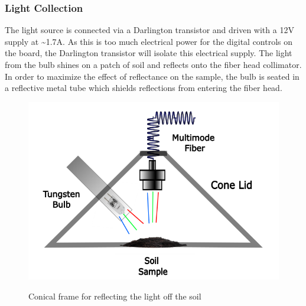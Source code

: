 \documentclass[journal]{IEEEtran}
\begin{document}
\subsubsection{Light Collection}
The light source is connected via a Darlington transistor and driven with a 12V supply at \~{}1.7A. As this is too much electrical power for the digital controls on the board, the Darlington transistor will isolate this electrical supply. The light from the bulb shines on a patch of soil and reflects onto the fiber head collimator. In order to maximize the effect of reflectance on the sample, the bulb is seated in a reflective metal tube which shields reflections from entering the fiber head.
\begin{figure}[H]
    \centering
    \includegraphics[scale=0.4]{images/Light Collection.png}
    \label{fig:Light-Collection-Diagram}
    \caption{Conical frame for reflecting the light off the soil}
\end{figure}
\end{document}
